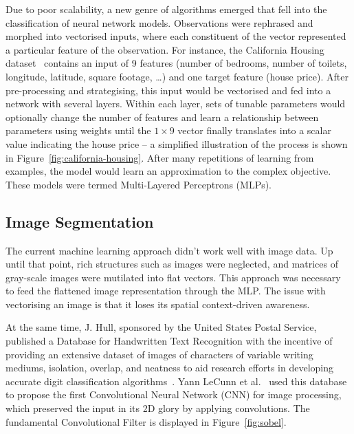 \documentclass[11pt,twoside]{report}
\begin{document}
Due to poor scalability, a new genre of algorithms emerged that fell into the classification of neural network models. Observations were rephrased and morphed into vectorised inputs, where each constituent of the vector represented a particular feature of the observation. For instance, the California Housing dataset~\cite{kelleypace1997} contains an input of 9 features (number of bedrooms, number of toilets, longitude, latitude, square footage, \dots) and one target feature (house price). After pre-processing and strategising, this input would be vectorised and fed into a network with several layers. Within each layer, sets of tunable parameters would optionally change the number of features and learn a relationship between parameters using weights until the $1 \times 9$ vector finally translates into a scalar value indicating the house price -- a simplified illustration of the process is shown in Figure~\ref{fig:california-housing}. After many repetitions of learning from examples, the model would learn an approximation to the complex objective. These models were termed Multi-Layered Perceptrons (MLPs).

\subsection{Image Segmentation}\label{sect:image-segmentation}

The current machine learning approach didn't work well with image data. Up until that point, rich structures such as images were neglected, and matrices of gray-scale images were mutilated into flat vectors. This approach was necessary to feed the flattened image representation through the MLP. The issue with vectorising an image is that it loses its spatial context-driven awareness. 

At the same time, J. Hull, sponsored by the United States Postal Service, published a Database for Handwritten Text Recognition with the incentive of providing an extensive dataset of images of characters of variable writing mediums, isolation, overlap, and neatness to aid research efforts in developing accurate digit classification algorithms~\cite{JJHull1994}. Yann LeCunn et al.~\cite{Lenet1998} used this database to propose the first Convolutional Neural Network (CNN) for image processing, which preserved the input in its 2D glory by applying convolutions. The fundamental Convolutional Filter is displayed in Figure~\ref{fig:sobel}.
\end{document}

